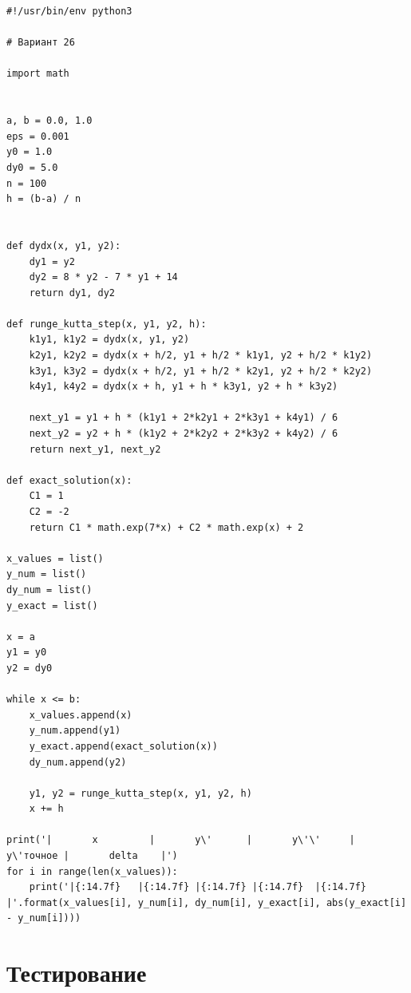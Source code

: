 \documentclass[14pt, russian]{scrartcl}
\begin{document}
\vspace{0.5cm}
  \begin{verbatim}
#!/usr/bin/env python3

# Вариант 26

import math


a, b = 0.0, 1.0
eps = 0.001
y0 = 1.0
dy0 = 5.0
n = 100
h = (b-a) / n


def dydx(x, y1, y2):
    dy1 = y2
    dy2 = 8 * y2 - 7 * y1 + 14
    return dy1, dy2

def runge_kutta_step(x, y1, y2, h):
    k1y1, k1y2 = dydx(x, y1, y2)
    k2y1, k2y2 = dydx(x + h/2, y1 + h/2 * k1y1, y2 + h/2 * k1y2)
    k3y1, k3y2 = dydx(x + h/2, y1 + h/2 * k2y1, y2 + h/2 * k2y2)
    k4y1, k4y2 = dydx(x + h, y1 + h * k3y1, y2 + h * k3y2)

    next_y1 = y1 + h * (k1y1 + 2*k2y1 + 2*k3y1 + k4y1) / 6
    next_y2 = y2 + h * (k1y2 + 2*k2y2 + 2*k3y2 + k4y2) / 6
    return next_y1, next_y2

def exact_solution(x):
    C1 = 1
    C2 = -2
    return C1 * math.exp(7*x) + C2 * math.exp(x) + 2

x_values = list()
y_num = list()
dy_num = list()
y_exact = list()

x = a
y1 = y0
y2 = dy0

while x <= b:
    x_values.append(x)
    y_num.append(y1)
    y_exact.append(exact_solution(x))
    dy_num.append(y2)

    y1, y2 = runge_kutta_step(x, y1, y2, h)
    x += h

print('|       x         |       y\'      |       y\'\'     |       y\'точное |       delta    |')
for i in range(len(x_values)):
    print('|{:14.7f}   |{:14.7f} |{:14.7f} |{:14.7f}  |{:14.7f}  |'.format(x_values[i], y_num[i], dy_num[i], y_exact[i], abs(y_exact[i] - y_num[i])))
  \end{verbatim}

\section{Тестирование}
\end{document}
